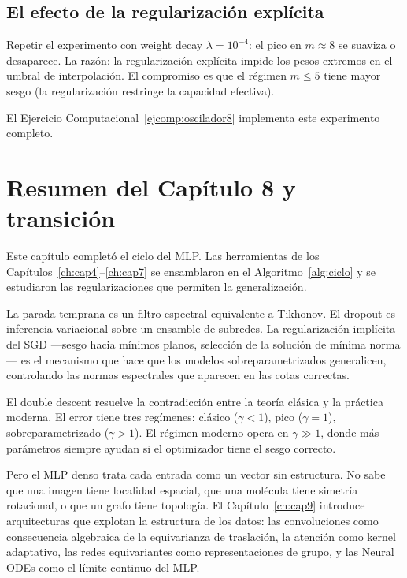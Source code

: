 \subsection{El efecto de la regularización explícita}
\label{subsec:osc_reg}

Repetir el experimento con weight decay $\lambda = 10^{-4}$: el pico en
$m \approx 8$ se suaviza o desaparece. La razón: la regularización
explícita impide los pesos extremos en el umbral de interpolación. El
compromiso es que el régimen $m \leq 5$ tiene mayor sesgo (la
regularización restringe la capacidad efectiva).

El Ejercicio Computacional~\ref{ejcomp:oscilador8} implementa este
experimento completo.

\section{Resumen del Capítulo 8 y transición}
\label{sec:resumen8}

Este capítulo completó el ciclo del MLP. Las herramientas de los
Capítulos~\ref{ch:cap4}--\ref{ch:cap7} se ensamblaron en el
Algoritmo~\ref{alg:ciclo} y se estudiaron las regularizaciones que
permiten la generalización.

La parada temprana es un filtro espectral equivalente a Tikhonov. El
dropout es inferencia variacional sobre un ensamble de subredes. La
regularización implícita del SGD —sesgo hacia mínimos planos,
selección de la solución de mínima norma— es el mecanismo que hace que
los modelos sobreparametrizados generalicen, controlando las normas
espectrales que aparecen en las cotas correctas.

El double descent resuelve la contradicción entre la teoría clásica y la
práctica moderna. El error tiene tres regímenes:
clásico ($\gamma < 1$), pico ($\gamma = 1$), sobreparametrizado
($\gamma > 1$). El régimen moderno opera en $\gamma \gg 1$, donde más
parámetros siempre ayudan si el optimizador tiene el sesgo correcto.

Pero el MLP denso trata cada entrada como un vector sin estructura. No
sabe que una imagen tiene localidad espacial, que una molécula tiene
simetría rotacional, o que un grafo tiene topología. El
Capítulo~\ref{ch:cap9} introduce arquitecturas que explotan la estructura
de los datos: las convoluciones como consecuencia algebraica de la
equivarianza de traslación, la atención como kernel adaptativo, las redes
equivariantes como representaciones de grupo, y las Neural ODEs como el
límite continuo del MLP.

